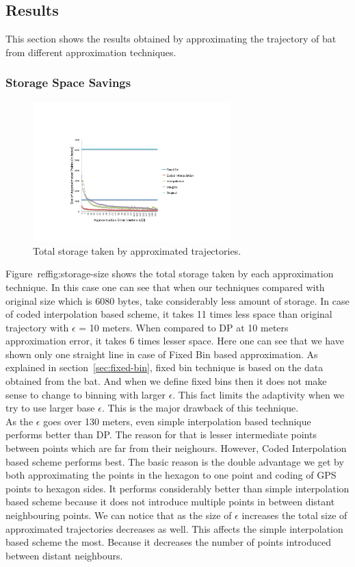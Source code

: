 \documentclass[conference]{IEEEtran}
\begin{document}
 \subsection{Results}
This section shows the results obtained by approximating the trajectory of bat from different approximation techniques.
\subsubsection{Storage Space Savings}
\begin{figure}[h]
  \centering
  \includegraphics[width=3in]{images/total-storage-size.pdf}
  \caption {Total storage taken by approximated trajectories.}
  \label{fig:storage-size}
\end{figure}
Figure~ref{fig:storage-size} shows the total storage taken by each approximation technique. In this case one can see that when our techniques compared with original size which is 6080 bytes, take considerably less amount of storage. In case of coded interpolation based scheme, it takes 11 times less space than original trajectory with $\epsilon$ = 10 meters. When compared to DP at 10 meters approximation error, it takes 6 times lesser space. Here one can see that we have shown only one straight line in case of Fixed Bin based approximation. As explained in section~\ref{sec:fixed-bin}, fixed bin technique is based on the data obtained from the bat. And when we define fixed bins then it does not make sense to change to binning with larger $\epsilon$. This fact limits the adaptivity when we try to use larger base $\epsilon$. This is the major drawback of this technique.\\ 
As the $\epsilon$ goes over 130 meters, even simple interpolation based technique performs better than DP. The reason for that is lesser intermediate points between points which are far from their neighours. However, Coded Interpolation based scheme performs best. The basic reason is the double advantage we get by both approximating the points in the hexagon to one point and coding of GPS points to hexagon sides. It performs considerably better than simple interpolation based scheme because it does not introduce multiple points in between distant neighbouring points. We can notice that as the size of $\epsilon$ increases the total size of approximated trajectories decreases as well. This affects the simple interpolation based scheme the most. Because it decreases the number of points introduced between distant neighbours.\\
\end{document}
